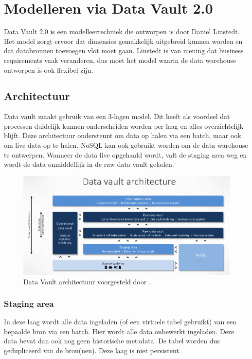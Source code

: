 \section{Modelleren via Data Vault 2.0}
Data Vault 2.0 is een modelleertechniek die ontworpen is door Daniel Linstedt. Het model zorgt ervoor dat dimensies gemakkelijk uitgebreid kunnen worden en dat databronnen toevoegen vlot moet gaan. Linstedt is van mening dat business requirements vaak veranderen, dus moet het model waarin de data warehouse ontworpen is ook flexibel zijn. 
~\autocite{Linstedt2016}
\subsection{Architectuur}
Data vault maakt gebruik van een 3-lagen model. Dit heeft als voordeel dat processen duidelijk kunnen onderscheiden worden per laag en alles overzichtelijk blijft. Deze architectuur ondersteunt om data op halen via een batch, maar ook om live data op te halen. NoSQL kan ook gebruikt worden om de data warehouse te ontwerpen. Wanneer de data live opgehaald wordt, valt de staging area weg en wordt de data onmiddellijk in de raw data vault geladen.  ~\autocite{Linstedt2016}


\begin{figure}[h]
	\includegraphics[scale=0.63]{../images/DVArchitectuur.png}
	\caption{Data Vault architectuur voorgesteld door \textcite{Stroobants2018}.}
	\label{fig:dvarch}
\end{figure}

\subsubsection{Staging area}
In deze laag wordt alle data ingeladen (of een virtuele tabel gebruikt) van een bepaalde bron via een batch. Hier wordt alle data onbewerkt ingeladen. Deze data bevat dan ook nog geen historische metadata. De tabel worden dus gedupliceerd van de bron(nen). Deze laag is niet persistent.

